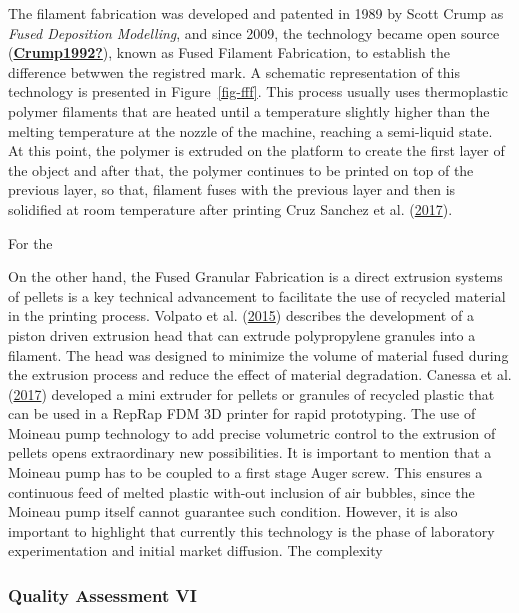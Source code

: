 \documentclass[
  11pt,
]{article}
\begin{document}
The filament fabrication was developed and patented in 1989 by Scott
Crump as \emph{Fused Deposition Modelling}, and since 2009, the
technology became open source
(\protect\hyperlink{ref-Crump1992}{\textbf{Crump1992?}}), known as Fused
Filament Fabrication, to establish the difference betwwen the registred
mark. A schematic representation of this technology is presented in
Figure~\ref{fig-fff}. This process usually uses thermoplastic polymer
filaments that are heated until a temperature slightly higher than the
melting temperature at the nozzle of the machine, reaching a semi-liquid
state. At this point, the polymer is extruded on the platform to create
the first layer of the object and after that, the polymer continues to
be printed on top of the previous layer, so that, filament fuses with
the previous layer and then is solidified at room temperature after
printing Cruz Sanchez et al.
(\protect\hyperlink{ref-CruzSanchez2017}{2017}).

For the

On the other hand, the Fused Granular Fabrication is a direct extrusion
systems of pellets is a key technical advancement to facilitate the use
of recycled material in the printing process. Volpato et al.
(\protect\hyperlink{ref-Volpato2015}{2015}) describes the development of
a piston driven extrusion head that can extrude polypropylene granules
into a filament. The head was designed to minimize the volume of
material fused during the extrusion process and reduce the effect of
material degradation. Canessa et al.
(\protect\hyperlink{ref-Canessa2017}{2017}) developed a mini extruder
for pellets or granules of recycled plastic that can be used in a RepRap
FDM 3D printer for rapid prototyping. The use of Moineau pump technology
to add precise volumetric control to the extrusion of pellets opens
extraordinary new possibilities. It is important to mention that a
Moineau pump has to be coupled to a first stage Auger screw. This
ensures a continuous feed of melted plastic with-out inclusion of air
bubbles, since the Moineau pump itself cannot guarantee such condition.
However, it is also important to highlight that currently this
technology is the phase of laboratory experimentation and initial market
diffusion. The complexity

\hypertarget{quality-assessment-vi}{%
\subsubsection{Quality Assessment VI}\label{quality-assessment-vi}}
\end{document}
